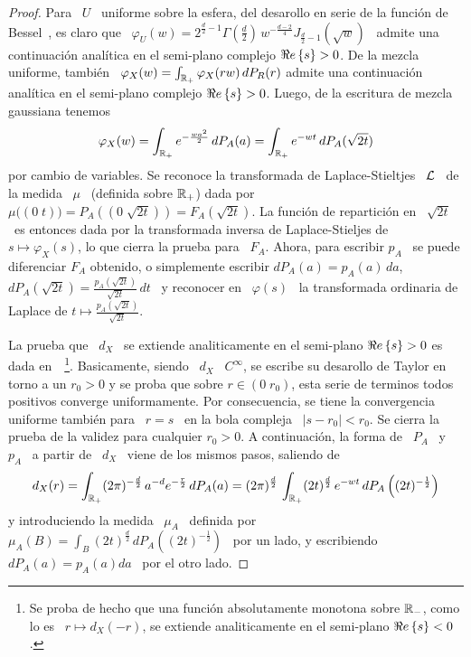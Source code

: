 \begin{proof}
  Para \ $U$ \ uniforme sobre la  esfera, del desarollo en serie de la funci\'on
  de   Bessel~\cite[Ec.~8.402]{GraRyz15},  es  claro   que  \   $\varphi_U(w)  =
  2^{\frac{d}{2}-1}  \Gamma\left(   \frac{d}{2}  \right)  \,  w^{-\frac{d-2}{4}}
  J_{\frac{d}{2}-1}(\sqrt{w})$  \ admite  una continuaci\'on  anal\'itica  en el
  semi-plano  complejo $\Re e \left\{ s \right\}  >  0$.   De la  mezcla  uniforme, tambi\'en  \
  $\varphi_X(w)  =   \int_{\mathbb{R}_+}  \varphi_X(r  w)  \,   dP_R(r)$  admite  una
  continuaci\'on anal\'itica en el semi-plano complejo $\Re e \left\{ s \right\} > 0$. Luego, de
  la escritura de mezcla gaussiana tenemos
  \[
  \varphi_X(w) = \int_{\mathbb{R}_+} e^{-\frac{w a^2}{2}} \, dP_A(a) = \int_{\mathbb{R}_+}
  e^{- w t} \, dP_A(\sqrt{2 t})
  \]
  por cambio  de variables. Se  reconoce la transformada de  Laplace-Stieltjes \
  $\mathcal{L}$ \ de la medida \ $\mu$  \ (definida sobre $\mathbb{R}_+$) dada por \ $\mu\big(
  (0  \;  t)  \big) =  P_A\left(  \left(  0  \;  \sqrt{2  t} \right)  \right)  =
  F_A(\sqrt{2  t})$.  La  funci\'on  de repartici\'on  en  \ $\sqrt{2  t}$ \  es
  entonces dada por la transformada  inversa de Laplace-Stieljes de \ $s \mapsto
  \varphi_X(s)$, lo  que cierra  la prueba para  \ $F_A$.  Ahora,  para escribir
  $p_A$ \ se puede diferenciar $F_A$ obtenido, o simplemente escribir $dP_A(a) =
  p_A(a) \, da$, \ie \ $dP_A(\sqrt{2 t}) = \frac{p_A(\sqrt{2 t})}{\sqrt{2 t}} \,
  dt$ \ y reconocer en \  $\varphi(s)$ \ la transformada ordinaria de Laplace de
  $t \mapsto \frac{p_A(\sqrt{2 t})}{\sqrt{2 t}}$.

  La prueba que \ $d_X$ \  se extiende analiticamente en el semi-plano $\Re e \left\{ s \right\}
  >0 $ es dada en~\cite[Cap.~IV, Teo.~3a]{Wid46}~\footnote{Se proba de hecho que
    una  funci\'on absolutamente  monotona  sobre  $\mathbb{R}_-$, como  lo  es \  $r
    \mapsto d_X(-r)$,  se extiende analiticamente  en el semi-plano  $\Re e \left\{ s \right\} <
    0$.}. Basicamente, siendo  \ $d_X$ \ $C^\infty$, se  escribe su desarollo de
  Taylor en torno a un  $r_0 > 0$ y se proba que sobre $r  \in (0 \; r_0)$, esta
  serie de terminos todos positivos converge uniformamente. Por consecuencia, se
  tiene la convergencia uniforme tambi\'en para \  $r = s$ \ en la bola compleja
  \ $|s-r_0|  < r_0$. Se cierra  la prueba de  la validez para cualquier  $r_0 >
  0$. A continuaci\'on, la forma de \ $P_A$ \  y \ $p_A$ \ a partir de \ $d_X$ \
  viene de los mismos pasos, saliendo de
  \[
  d_X(r) =  \int_{\mathbb{R}_+} (2 \pi)^{-\frac{d}{2}} \,  a^{-d} e^{-\frac{r}{2}} \,
  dP_A(a) = (2 \pi)^{\frac{d}{2}}  \, \int_{\mathbb{R}_+} (2 t)^{\frac{d}{2}} \, e^{-
    w t} \, dP_A\left( (2 t)^{-\frac12} \right)
  \]
  y introduciendo la medida \ $\mu_A$ \ definida por \ $\displaystyle \mu_A(B) =
  \int_B (2  t)^{\frac{d}{2}} \, dP_A\left(  (2 t)^{-\frac12} \right)$ \  por un
  lado, y escribiendo \ $dP_A(a) = p_A(a) da$ \ por el otro lado.
\end{proof}

